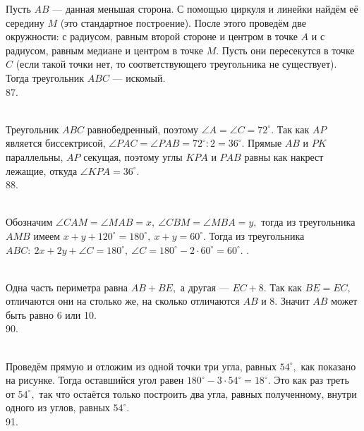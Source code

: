 Пусть $AB$ --- данная меньшая сторона. С помощью циркуля и линейки найдём её середину $M$ (это стандартное построение). После этого проведём две окружности: с радиусом, равным второй стороне и центром в точке $A$ и с радиусом, равным медиане и центром в точке $M.$ Пусть они пересекутся в точке $C$ (если такой точки нет, то соответствующего треугольника не существует). Тогда треугольник $ABC$ --- искомый.\\
87. \begin{figure}[ht!]
\end{figure}\\
Треугольник $ABC$ равнобедренный, поэтому $\angle A=\angle C =72^\circ.$ Так как $AP$ является биссектрисой, $\angle PAC=\angle PAB=72^\circ:2=36^\circ.$ Прямые $AB$ и $PK$ параллельны, $AP$ секущая, поэтому углы $KPA$ и $PAB$ равны как накрест лежащие, откуда $\angle KPA=36^\circ.$\\
88. \begin{figure}[ht!]
\end{figure}\\
Обозначим $\angle CAM=\angle MAB=x,\ \angle CBM=\angle MBA=y,$ тогда из треугольника $AMB$ имеем $x+y+120^\circ=180^\circ,\ x+y=60^\circ.$ Тогда из треугольника $ABC:\ 2x+2y+\angle C=180^\circ,\ \angle C=180^\circ-2\cdot60^\circ=60^\circ.$\newpage
{}. \begin{figure}[ht!]
\end{figure}\\
Одна часть периметра равна $AB+BE,$ а другая --- $EC+8.$ Так как $BE=EC,$ отличаются они на столько же, на сколько отличаются $AB$ и 8. Значит $AB$ может быть равно 6 или 10.\\
90. \begin{figure}[ht!]
\end{figure}\\Проведём прямую и отложим из одной точки три угла, равных $54^\circ,$ как показано на рисунке. Тогда оставшийся угол равен $180^\circ-3\cdot54^\circ=18^\circ.$ Это как раз треть от $54^\circ,$ так что остаётся только построить два угла, равных полученному, внутри одного из углов, равных $54^\circ.$\\
91. \begin{figure}[ht!]
\end{figure}\\
